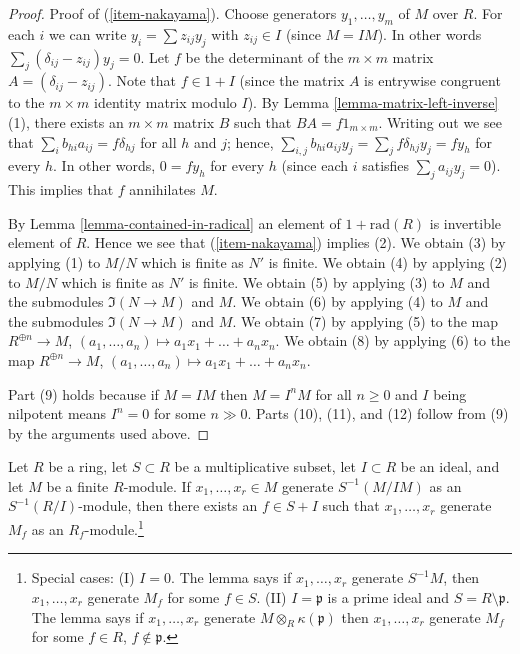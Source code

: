 \begin{proof}
Proof of (\ref{item-nakayama}). Choose generators $y_1, \ldots, y_m$ of $M$
over $R$. For each $i$ we can write $y_i = \sum z_{ij} y_j$ with
$z_{ij} \in I$ (since $M = IM$).
In other words $\sum_j (\delta_{ij} - z_{ij})y_j = 0$.
Let $f$ be the determinant of the $m \times m$ matrix
$A = (\delta_{ij} - z_{ij})$. Note that $f \in 1 + I$
(since the matrix $A$ is entrywise congruent to the
$m \times m$ identity matrix modulo $I$).
By Lemma \ref{lemma-matrix-left-inverse} (1),
there exists an $m \times m$
matrix $B$ such that $BA = f 1_{m \times m}$. Writing out we see that
$\sum_{i} b_{hi} a_{ij} = f \delta_{hj}$ for all
$h$ and $j$; hence, $\sum_{i, j} b_{hi} a_{ij} y_j
= \sum_{j} f \delta_{hj} y_j = f y_h$ for every $h$.
In other words, $0 = f y_h$ for every $h$ (since each
$i$ satisfies $\sum_j a_{ij} y_j = 0$).
This implies that $f$ annihilates $M$.

\medskip\noindent
By Lemma \ref{lemma-contained-in-radical} an element of $1 + \text{rad}(R)$ is
invertible element of $R$. Hence we see that (\ref{item-nakayama}) implies
(2). We obtain (3) by applying (1) to $M/N$ which is finite as $N'$ is finite.
We obtain (4) by applying (2) to $M/N$ which is finite as $N'$ is finite.
We obtain (5) by applying (3) to $M$ and the submodules $\Im(N \to M)$
and $M$. We obtain (6) by applying (4) to $M$ and the submodules
$\Im(N \to M)$ and $M$.
We obtain (7) by applying (5) to the map $R^{\oplus n} \to M$,
$(a_1, \ldots, a_n) \mapsto a_1x_1 + \ldots + a_nx_n$.
We obtain (8) by applying (6) to the map $R^{\oplus n} \to M$,
$(a_1, \ldots, a_n) \mapsto a_1x_1 + \ldots + a_nx_n$.

\medskip\noindent
Part (9) holds because if $M = IM$ then $M = I^nM$ for all $n \geq 0$
and $I$ being nilpotent means $I^n = 0$ for some $n \gg 0$. Parts
(10), (11), and (12) follow from (9) by the arguments used above.
\end{proof}

\begin{lemma}
\label{lemma-NAK-localization}
Let $R$ be a ring, let $S \subset R$ be a multiplicative subset,
let $I \subset R$ be an ideal, and let $M$ be a finite $R$-module.
If $x_1, \ldots, x_r \in M$ generate $S^{-1}(M/IM)$
as an $S^{-1}(R/I)$-module, then there exists an $f \in S + I$
such that $x_1, \ldots, x_r$ generate $M_f$ as an
$R_f$-module.\footnote{Special cases: (I) $I = 0$. The lemma says
if $x_1, \ldots, x_r$ generate $S^{-1}M$, then $x_1, \ldots, x_r$
generate $M_f$ for some $f \in S$. (II) $I = \mathfrak p$ is
a prime ideal and $S = R \setminus \mathfrak p$. The lemma says if
$x_1, \ldots, x_r$ generate $M \otimes_R \kappa(\mathfrak p)$
then $x_1, \ldots, x_r$ generate $M_f$ for some
$f \in R$, $f \not \in \mathfrak p$.}
\end{lemma}

